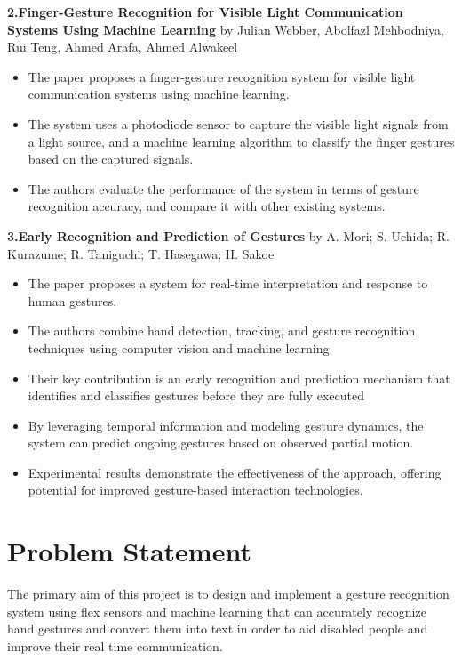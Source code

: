 \documentclass[a4paper,12pt,oneside]{report}
\begin{document}
\par {\textbf{ 2.Finger-Gesture Recognition for Visible Light Communication Systems Using Machine Learning
}}
 by Julian Webber, Abolfazl Mehbodniya, Rui Teng, Ahmed Arafa, Ahmed Alwakeel
  \begin{itemize}
    \item The paper proposes a finger-gesture recognition system for visible light communication systems using machine learning.
    \item The system uses a photodiode sensor to capture the visible light signals from a light source, and a machine learning algorithm to classify the finger gestures based on the captured signals.
    \item The authors evaluate the performance of the system in terms of gesture recognition accuracy, and compare it with other existing systems.


   
\end{itemize}
\par {\textbf{ 3.Early Recognition and Prediction of Gestures
}}
 by A. Mori; S. Uchida; R. Kurazume; R. Taniguchi; T. Hasegawa; H. Sakoe
  \begin{itemize}
    \item The paper proposes a system for real-time interpretation and response to human gestures.
    \item  The authors combine hand detection, tracking, and gesture recognition techniques using computer vision and machine learning. 
    \item Their key contribution is an early recognition and prediction mechanism that identifies and classifies gestures before they are fully executed
    \item By leveraging temporal information and modeling gesture dynamics, the system can predict ongoing gestures based on observed partial motion.
    \item Experimental results demonstrate the effectiveness of the approach, offering potential for improved gesture-based interaction technologies.


   
\end{itemize}



\section{Problem Statement}
The primary aim of this project is to design and implement a gesture recognition system using flex sensors and machine learning that can accurately recognize hand gestures and convert them into text in order to aid disabled people and improve their real time communication.
\par
\end{document}
